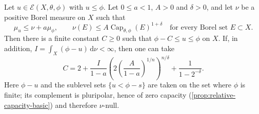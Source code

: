 \begin{theorem}\label{thm:relative-capacity-dominated-boundedness}
Let $u\in\mathcal E(X,\theta,\phi)$ with $u\leq\phi$. Let $0\leq a<1$, $A>0$ and $\delta>0$, and let $\nu$ be a positive Borel measure on $X$ such that
\begin{equation}\label{eq:relative-capacity-measure-domination}
 \mu_u\leq\nu+a\mu_\phi,\qquad
 \nu(E)\leq A\operatorname{Cap}_{\theta,\phi}(E)^{1+\delta}
                    \quad\text{for every Borel set }E\subset X.
\end{equation}
Then there is a finite constant $C\geq0$ such that $\phi-C\leq u\leq\phi$ on $X$. If, in addition, $I=\int_X(\phi-u)\,\mathrm d\nu<\infty$, then one can take
\begin{equation}\label{eq:relative-capacity-moment-depth}
 C=2+\frac I{1-a}\left(2\left(\frac A{1-a}\right)^{1/n}\right)^{n/\delta}
                         +\frac1{1-2^{-\delta}}.
\end{equation}
Here $\phi-u$ and the sublevel sets $\{u<\phi-s\}$ are taken on the set where $\phi$ is finite; its complement is pluripolar, hence of zero capacity (\cref{prop:relative-capacity-basic}) and therefore $\nu$-null.
\end{theorem}
